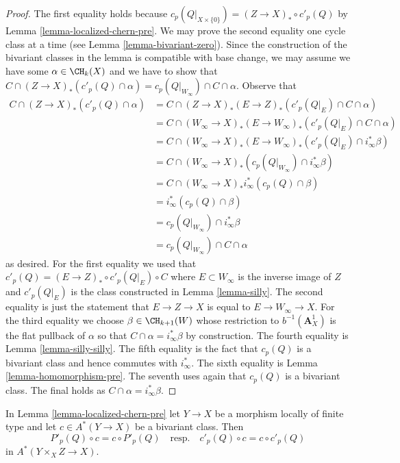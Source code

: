 \begin{proof}
The first equality holds because $c_p(Q|_{X \times \{0\}}) =
(Z \to X)_* \circ c'_p(Q)$ by Lemma \ref{lemma-localized-chern-pre}.
We may prove the second equality one cycle class at a time
(see Lemma \ref{lemma-bivariant-zero}). Since the construction of
the bivariant classes in the lemma is compatible with base change,
we may assume we have some $\alpha \in \CH_k(X)$ and we have to show that
$C \cap (Z \to X)_*(c'_p(Q) \cap \alpha) =
c_p(Q|_{W_\infty}) \cap C \cap \alpha$. Observe that
\begin{align*}
C \cap (Z \to X)_*(c'_p(Q) \cap \alpha)
& =
C \cap (Z \to X)_* (E \to Z)_*(c'_p(Q|_E) \cap C \cap \alpha) \\
& =
C \cap (W_\infty \to X)_*(E \to W_\infty)_*(c'_p(Q|_E) \cap C \cap \alpha) \\
& =
C \cap (W_\infty \to X)_*(E \to W_\infty)_*(c'_p(Q|_E) \cap i_\infty^*\beta) \\
& =
C \cap (W_\infty \to X)_*(c_p(Q|_{W_\infty}) \cap i_\infty^*\beta) \\
& =
C \cap (W_\infty \to X)_*i_\infty^*(c_p(Q) \cap \beta) \\
& =
i_\infty^*(c_p(Q) \cap \beta) \\
& =
c_p(Q|_{W_\infty}) \cap i_\infty^*\beta \\
& =
c_p(Q|_{W_\infty}) \cap C \cap \alpha
\end{align*}
as desired. For the first equality we used that
$c'_p(Q) = (E \to Z)_* \circ c'_p(Q|_E) \circ C$ where $E \subset W_\infty$
is the inverse image of $Z$ and $c'_p(Q|_E)$ is the class constructed
in Lemma \ref{lemma-silly}. The second equality is just the statement
that $E \to Z \to X$ is equal to $E \to W_\infty \to X$.
For the third equality we choose $\beta \in \CH_{k + 1}(W)$ whose restriction to
$b^{-1}(\mathbf{A}^1_X)$ is the flat pullback of $\alpha$ so that
$C \cap \alpha = i_\infty^*\beta$ by construction. The fourth equality is
Lemma \ref{lemma-silly-silly}. The fifth equality is the fact that
$c_p(Q)$ is a bivariant class and hence commutes with $i_\infty^*$.
The sixth equality is Lemma \ref{lemma-homomorphism-pre}.
The seventh uses again that $c_p(Q)$ is a bivariant class.
The final holds as $C \cap \alpha = i_\infty^*\beta$.
\end{proof}

\begin{lemma}
\label{lemma-homomorphism-commute}
In Lemma \ref{lemma-localized-chern-pre} let $Y \to X$ be a morphism
locally of finite type and let $c \in A^*(Y \to X)$ be a bivariant class.
Then
$$
P'_p(Q) \circ c = c \circ P'_p(Q)
\quad\text{resp.}\quad
c'_p(Q) \circ c = c \circ c'_p(Q)
$$
in $A^*(Y \times_X Z \to X)$.
\end{lemma}

